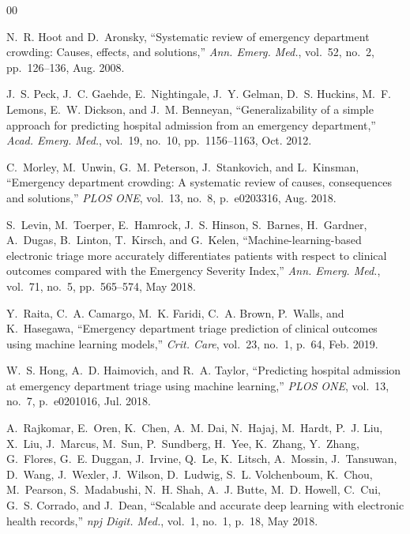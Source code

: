 \documentclass[conference]{IEEEtran}
\begin{document}
\begin{thebibliography}{00}

N.~R. Hoot and D.~Aronsky, ``Systematic review of emergency department crowding: Causes, effects, and solutions,'' \textit{Ann. Emerg. Med.}, vol.~52, no.~2, pp.~126--136, Aug. 2008.

J.~S. Peck, J.~C. Gaehde, E.~Nightingale, J.~Y. Gelman, D.~S. Huckins, M.~F. Lemons, E.~W. Dickson, and J.~M. Benneyan, ``Generalizability of a simple approach for predicting hospital admission from an emergency department,'' \textit{Acad. Emerg. Med.}, vol.~19, no.~10, pp.~1156--1163, Oct. 2012.

C.~Morley, M.~Unwin, G.~M. Peterson, J.~Stankovich, and L.~Kinsman, ``Emergency department crowding: A systematic review of causes, consequences and solutions,'' \textit{PLOS ONE}, vol.~13, no.~8, p.~e0203316, Aug. 2018.

S.~Levin, M.~Toerper, E.~Hamrock, J.~S. Hinson, S.~Barnes, H.~Gardner, A.~Dugas, B.~Linton, T.~Kirsch, and G.~Kelen, ``Machine-learning-based electronic triage more accurately differentiates patients with respect to clinical outcomes compared with the Emergency Severity Index,'' \textit{Ann. Emerg. Med.}, vol.~71, no.~5, pp.~565--574, May 2018.

Y.~Raita, C.~A. Camargo, M.~K. Faridi, C.~A. Brown, P.~Walls, and K.~Hasegawa, ``Emergency department triage prediction of clinical outcomes using machine learning models,'' \textit{Crit. Care}, vol.~23, no.~1, p.~64, Feb. 2019.

W.~S. Hong, A.~D. Haimovich, and R.~A. Taylor, ``Predicting hospital admission at emergency department triage using machine learning,'' \textit{PLOS ONE}, vol.~13, no.~7, p.~e0201016, Jul. 2018.

A.~Rajkomar, E.~Oren, K.~Chen, A.~M. Dai, N.~Hajaj, M.~Hardt, P.~J. Liu, X.~Liu, J.~Marcus, M.~Sun, P.~Sundberg, H.~Yee, K.~Zhang, Y.~Zhang, G.~Flores, G.~E. Duggan, J.~Irvine, Q.~Le, K.~Litsch, A.~Mossin, J.~Tansuwan, D.~Wang, J.~Wexler, J.~Wilson, D.~Ludwig, S.~L. Volchenboum, K.~Chou, M.~Pearson, S.~Madabushi, N.~H. Shah, A.~J. Butte, M.~D. Howell, C.~Cui, G.~S. Corrado, and J.~Dean, ``Scalable and accurate deep learning with electronic health records,'' \textit{npj Digit. Med.}, vol.~1, no.~1, p.~18, May 2018.


\end{thebibliography}
\end{document}
